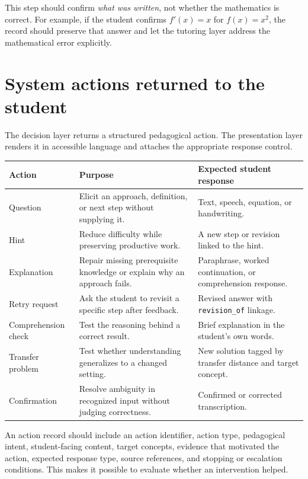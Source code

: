 \documentclass[11pt]{article}
\begin{document}
This step should confirm \emph{what was written}, not whether the mathematics is correct. For example, if the student confirms $f'(x)=x$ for $f(x)=x^2$, the record should preserve that answer and let the tutoring layer address the mathematical error explicitly.

\section{System actions returned to the student}

The decision layer returns a structured pedagogical action. The presentation layer renders it in accessible language and attaches the appropriate response control.

\noindent\begin{tabularx}{\textwidth}{@{}p{}p{}X@{}}
\toprule
\textbf{Action} & \textbf{Purpose} & \textbf{Expected student response} \\
\midrule
Question & Elicit an approach, definition, or next step without supplying it. & Text, speech, equation, or handwriting. \\
Hint & Reduce difficulty while preserving productive work. & A new step or revision linked to the hint. \\
Explanation & Repair missing prerequisite knowledge or explain why an approach fails. & Paraphrase, worked continuation, or comprehension response. \\
Retry request & Ask the student to revisit a specific step after feedback. & Revised answer with \texttt{revision\_of} linkage. \\
Comprehension check & Test the reasoning behind a correct result. & Brief explanation in the student's own words. \\
Transfer problem & Test whether understanding generalizes to a changed setting. & New solution tagged by transfer distance and target concept. \\
Confirmation & Resolve ambiguity in recognized input without judging correctness. & Confirmed or corrected transcription. \\
\bottomrule
\end{tabularx}

An action record should include an action identifier, action type, pedagogical intent, student-facing content, target concepts, evidence that motivated the action, expected response type, source references, and stopping or escalation conditions. This makes it possible to evaluate whether an intervention helped.
\end{document}
